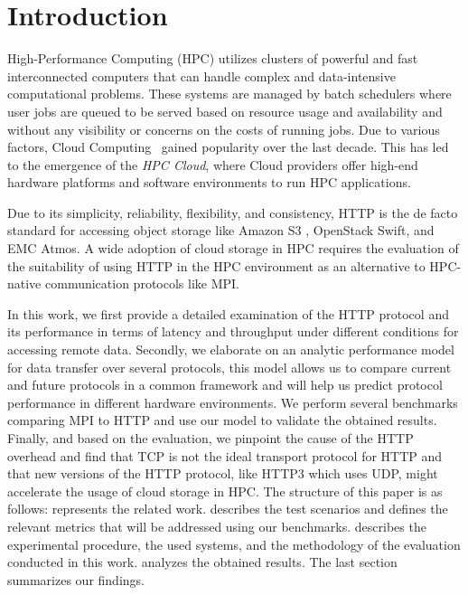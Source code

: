 \documentclass[runningheads]{llncs}
\begin{document}
\section {Introduction}
High-Performance Computing (HPC) utilizes clusters of powerful and fast interconnected computers that can handle complex and data-intensive computational problems. These systems are managed by batch schedulers \cite{ma2004dynamic} where user jobs are queued to be served based on resource usage and availability and without any visibility or concerns on the costs of running jobs.
Due to various factors, Cloud Computing \,\cite {mell2011nist} gained popularity over the last decade. This has led to the emergence of the \textit{HPC Cloud}, where Cloud providers offer high-end hardware platforms and software environments to run HPC applications.

Due to its simplicity, reliability, flexibility, and consistency, HTTP is the de facto standard for accessing object storage like Amazon S3 \cite{awsS3Url}, OpenStack Swift, and EMC Atmos. A wide adoption of cloud storage in HPC requires the evaluation of  the suitability of using HTTP in the HPC environment as an alternative to HPC-native communication protocols like MPI.

In this work, we first provide a detailed examination of the HTTP protocol and its performance in terms of latency and throughput under different conditions for accessing remote data. Secondly, we elaborate on an analytic performance model for data transfer over several protocols, this model allows us to compare current and future protocols in a common framework and will help us predict protocol performance in different hardware environments. We perform several benchmarks comparing MPI to HTTP and use our model to validate the obtained results. Finally, and based on the evaluation, we pinpoint the cause of the HTTP overhead and find that TCP is not the ideal transport protocol for HTTP and that new versions of the HTTP protocol, like HTTP3 which uses UDP, might accelerate the usage of cloud storage in HPC.
The structure of this paper is as follows:  represents the related work.  describes the test scenarios and defines the relevant metrics that will be addressed using our benchmarks.  describes the experimental procedure, the used systems, and the methodology of the evaluation conducted in this work.  analyzes the obtained results. The last section summarizes our findings.
\end{document}
